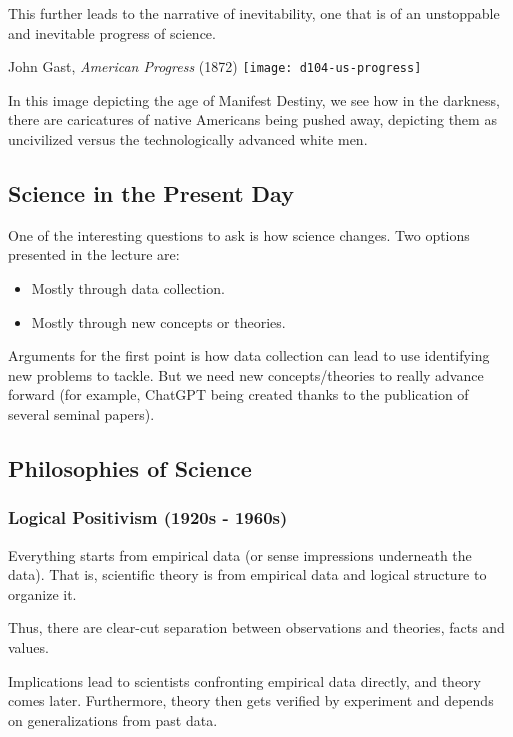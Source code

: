 \documentclass[openany]{book}
\begin{document}
This further leads to the narrative of inevitability, one that is of an unstoppable and inevitable progress of science.

\begin{figurebox}[]{John Gast, \textit{American Progress} (1872)}
	\centering\texttt{[image: d104-us-progress]}
\end{figurebox}

In this image depicting the age of Manifest Destiny, we see how in the darkness, there are caricatures of native Americans being pushed away, depicting them as uncivilized versus the technologically advanced white men.

\subsection{Science in the Present Day}
One of the interesting questions to ask is how science changes. Two options presented in the lecture are:
\begin{itemize}
	\item Mostly through data collection.
	\item Mostly through new concepts or theories.
\end{itemize}

Arguments for the first point is how data collection can lead to use identifying new problems to tackle. But we need new concepts/theories to really advance forward (for example, ChatGPT being created thanks to the publication of several seminal papers).

\subsection{Philosophies of Science}
\subsubsection{Logical Positivism (1920s - 1960s)}
\begin{defn}
	Everything starts from empirical data (or sense impressions underneath the data). That is, scientific theory is from empirical data and logical structure to organize it.
\end{defn}

Thus, there are clear-cut separation between observations and theories, facts and values.

Implications lead to scientists confronting empirical data directly, and theory comes later. Furthermore, theory then gets verified by experiment and depends on generalizations from past data.
\end{document}
